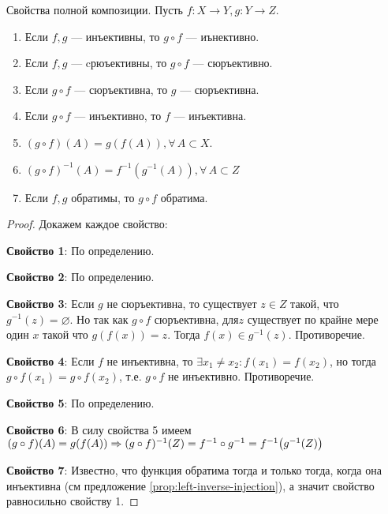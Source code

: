 \documentclass{article}
\begin{document}
\begin{proposition}
    \label{prop:comp-properties}
    Свойства полной композиции. Пусть \(f: X \rightarrow Y, g: Y \rightarrow Z\).
    \begin{enumerate}
        \item Если \(f, g\) --- инъективны, то \(g \circ f\) --- иънективно.
        \item Если \(f, g\) --- cрюъективны, то \(g \circ f\) --- сюръективно.
        \item Если \(g \circ f\) --- сюръективна, то \(g\) --- сюръективна.
        \item Если \(g \circ f\) --- инъективно, то \(f\) --- инъективна.
        \item \((g \circ f) (A) = g(f(A)), \forall\, A \subset X\).
        \item \((g \circ f)^{-1}(A) = f^{-1}(g^{-1}(A)), \forall\, A \subset Z\)
        \item Если \(f, g\) обратимы, то \(g \circ f\) обратима. 
    \end{enumerate}
\end{proposition}
\begin{proof} Докажем каждое свойство: 

    \textbf{Свойство 1}: По определению. 
    
    \textbf{Свойство 2}: По определению. 
    
    \textbf{Свойство 3}: Если \(g\) не сюръективна, то существует \(z \in Z\) такой, что \(g^{-1}(z) = \varnothing\). Но так как \(g \circ f\) сюръективна, для\(z\) существует по крайне мере один \(x\) такой что \(g(f(x)) = z\). Тогда \(f(x) \in g^{-1}(z)\). Противоречие.
    
    \textbf{Свойство 4}: Если \(f\) не инъективна, то \(\exists x_1 \ne x_2: f(x_1) = f(x_2)\), но тогда \(g \circ f (x_1) = g \circ f (x_2)\), т.е. \(g \circ f\) не инъективно. Противоречие. 
    
    \textbf{Свойство 5}: По определению. 
    
    \textbf{Свойство 6}: В силу свойства 5 имеем \((g \circ f)(A) = g(f(A)) \Rightarrow (g \circ f)^{-1}(Z) = f^{-1} \circ g^{-1} = f^{-1}\mleft(g^{-1}(Z)\mright)\)
    
    \textbf{Свойство 7}: Известно, что функция обратима тогда и только тогда, когда она инъективна (см предложение \ref{prop:left-inverse-injection}), а значит свойство равносильно свойству 1.
\end{proof}
\end{document}
